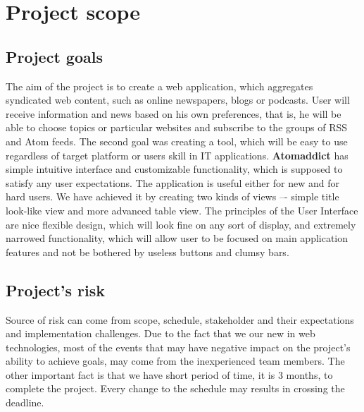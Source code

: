 \documentclass[12pt]{article}
\begin{document}

\section{Project scope}

\subsection{Project goals}\label{project goals}
The aim of the project is to create a web application, which aggregates syndicated web content, such as online newspapers, blogs or podcasts. User will receive information and news based on his own preferences, that is, he will be able to choose topics or particular websites and subscribe to the groups of RSS and Atom feeds. 
The second goal was creating a tool, which will be easy to use regardless of target platform or users skill in IT applications. \textbf{Atomaddict} has simple intuitive interface and customizable functionality, which is supposed to satisfy any user expectations.
The application is useful either for new and for hard users. We have achieved it by creating two kinds of views –- simple title look-like view and more advanced table view. The principles of the User Interface are nice flexible design, which will look fine on any sort of display, and extremely narrowed functionality, which will allow user to be focused on main application features and not be bothered by useless buttons and clumsy bars.


\subsection{Project's risk}

Source of risk can come from scope, schedule, stakeholder and their expectations and implementation challenges. Due to the fact that we our new in web technologies, most of the events that may have negative impact on the project’s ability to achieve goals, may come from the inexperienced team members. The other important fact is that we have short period of time, it is 3 months, to complete the project. Every change to the schedule may results in crossing the deadline.

\end{document}
